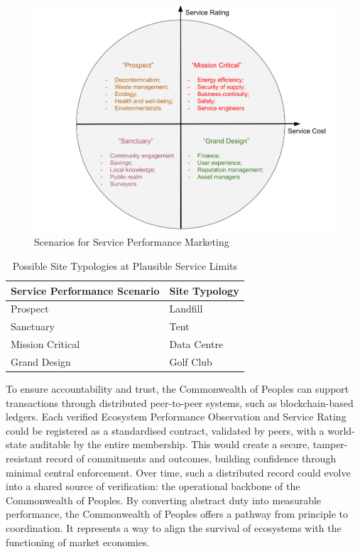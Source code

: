 \begin{figure}[H]
\centering
\includegraphics[width=1\textwidth]{scenarios}
\caption{Scenarios for Service Performance Marketing}
\label{Scenarios}
\end{figure}

\begin{table}[H]
\caption{Possible Site Typologies at Plausible Service Limits}
\begin{center}
\begin{tabular}{| l | l |}
\hline
Service Performance Scenario&Site Typology\\
\hline
Prospect&Landfill\\
Sanctuary&Tent\\
Mission Critical&Data Centre\\
Grand Design&Golf Club\\
\hline
\end{tabular}
\end{center}
\label{Service limits table}
\end{table}

To ensure accountability and trust, the Commonwealth of Peoples can support transactions through distributed peer-to-peer systems, such as blockchain-based ledgers.
Each verified Ecosystem Performance Observation and Service Rating could be registered as a standardised contract, validated by peers, with a world-state auditable by the entire membership.
This would create a secure, tamper-resistant record of commitments and outcomes, building confidence through minimal central enforcement.
Over time, such a distributed record could evolve into a shared source of verification: the operational backbone of the Commonwealth of Peoples.
By converting abstract duty into measurable performance, the Commonwealth of Peoples offers a pathway from principle to coordination.
It represents a way to align the survival of ecosystems with the functioning of market economies.\\

